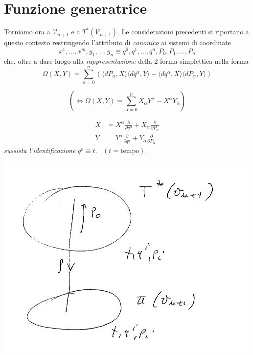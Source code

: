 \section{Funzione generatrice}

\setcounter{equation}{0}

Torniamo ora a $\mathcal{V}_{n+1}$ e a $T^* (\mathcal{V}_{n+1})$. Le considerazioni precedenti si riportano a questo contesto restringendo l'attributo di \textit{canonico} ai sistemi di coordinate \\
\label{pag_funz_gen}
\begin{equation*}
	x^1, \dots ,x^m, y_1, \dots , y_n \equiv q^0, q^1, \dots , q^n, P_0, P_1, \dots , P_n
\end{equation*}
che, oltre a dare luogo alla \textit{rappresentazione} della $ 2 $-forma simplettica nella forma
\begin{equation*}
	\Omega(X, Y) = \sum_{\alpha = 0}^n \left( \langle dP_{\alpha}, X \rangle \langle dq^{\alpha}, Y \rangle - \langle dq^{\alpha}, X \rangle \langle dP_{\alpha}, Y \rangle \right)
\end{equation*}

\begin{equation*}
	\left( \iff \Omega(X, Y) = \sum_{\alpha = 0}^{n} X_{\alpha} Y^{\alpha} - X^{\alpha} Y_{\alpha} \right)
\end{equation*}

\begin{align*}
	X &= X^{\alpha} \frac{\partial}{\partial q^{\alpha}} + X_{\alpha} \frac{\partial}{\partial P_{\alpha}} \\
	Y &= Y^{\alpha} \frac{\partial}{\partial q^{\alpha}} + Y_{\alpha} \frac{\partial}{\partial P_{\alpha}}
\end{align*}
\textit{sussista l'identificazione} $q^o \equiv t$. \, $( t = \text{tempo} )$.

\begin{center}
\includegraphics[width=0.5\columnwidth]{media/funzione-generatrice/32-1.jpg}
\end{center}

